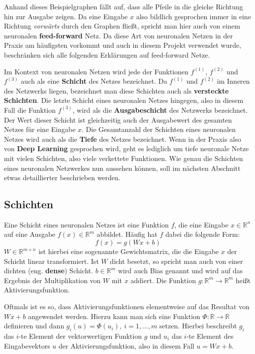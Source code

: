 Anhand dieses Beispielgraphen f\"allt auf, dass alle Pfeile in die
gleiche Richtung hin zur Ausgabe zeigen. Da eine Eingabe $x$ also
bildlich gesprochen immer in eine Richtung \textit{vorw\"arts} durch
den Graphen flie{\ss}t, spricht man hier auch von einem neuronalen
\textbf{feed-forward} Netz. Da diese Art von neuronalen Netzen in der
Praxis am h\"aufigsten vorkommt und auch in diesem Projekt verwendet
wurde, beschr\"anken sich alle folgenden Erkl\"arungen auf
feed-forward Netze.

Im Kontext von neuronalen Netzen wird jede der Funktionen
$f^{(1)}$, $f^{(2)}$ und $f^{(3)}$ auch als eine \textbf{Schicht} des
Netzes bezeichnet.
Da $f^{(1)}$ und $f^{(2)}$ im Inneren des Netzwerks liegen, bezeichnet man
diese Schichten auch als \textbf{versteckte Schichten}.
Die letzte Schicht eines neuronalen Netzes hingegen, also in diesem
Fall die Funktion $f^{(3)}$, wird als die \textbf{Ausgabeschicht} des
Netzwerks bezeichnet. Der Wert dieser Schicht ist gleichzeitig
auch der Ausgabewert des gesamten Netzes f\"ur eine Eingabe $x$.
Die Gesamtanzahl der Schichten eines neuronalen Netzes wird auch
als die \textbf{Tiefe} des Netzes bezeichnet.
Wenn in der Praxis also von \textbf{Deep Learning} gesprochen wird,
geht es lediglich um tiefe neuronale Netze mit vielen Schichten,
also viele verkettete Funktionen.
Wie genau die Schichten eines neuronalen Netzwerkes nun aussehen k\"onnen,
soll im n\"achsten Abschnitt etwas detaillierter beschrieben werden.

\subsection{Schichten}
\label{sec:schichten}

Eine Schicht eines neuronalen Netzes ist eine Funktion $f$, die eine
Eingabe $x \in \mathbb{R}^n$ auf eine Ausgabe $f(x) \in \mathbb{R}^m$
abbildet. H\"aufig hat $f$ dabei die folgende Form:
\begin{equation}
    f(x) = g(Wx + b)
\end{equation}
$W \in \mathbb{R}^{m \times n}$ ist hierbei eine sogenannte Gewichtsmatrix,
die die Eingabe $x$ der Schicht linear transformiert.
Ist $W$ dicht besetzt, so spricht man auch von einer dichten
(eng. \textbf{dense}) Schicht.
$b \in \mathbb{R}^m$ wird auch Bias genannt und wird auf das Ergebnis der
Multiplikation von $W$ mit $x$ addiert.
Die Funktion $g: \mathbb{R}^m \rightarrow \mathbb{R}^m$ hei{\ss}t
Aktivierungsfunktion.

Oftmals ist es so, dass Aktivierungsfunktionen elementweise auf das
Resultat von $Wx + b$ angewendet werden. Hierzu kann man sich eine
Funktion $\Phi: \mathbb{R} \rightarrow \mathbb{R}$ definieren und dann
$g_i(u) = \Phi(u_i), \  i=1,...,m$ setzen. Hierbei beschreibt $g_i$
das $i$-te Element der vektorwertigen Funktion $g$ und $u_i$ das $i$-te
Element des Eingabevektors $u$ der Aktivierungsfunktion,
also in diesem Fall $u = Wx + b$.


